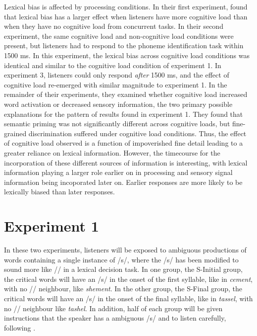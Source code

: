 Lexical bias is affected by processing conditions.  
In their first experiment, \citet{Mattys2011} found that lexical bias has a larger effect when listeners have more cognitive load than when they have no cognitive load from concurrent tasks.  
In their second experiment, the same cognitive load and non-cognitive load conditions were present, but listeners had to respond to the phoneme identification task within 1500 ms.  
In this experiment, the lexical bias across cognitive load conditions was identical and similar to the cognitive load condition of experiment 1.  
In experiment 3, listeners could only respond \emph{after} 1500 ms, and the effect of cognitive load re-emerged with similar magnitude to experiment 1.  
In the remainder of their experiments, they examined whether cognitive load increased word activation or decreased sensory information, the two primary possible explanations for the pattern of results found in experiment 1.  
They found that semantic priming was not significantly different across cognitive loads, but fine-grained discrimination suffered under cognitive load conditions.  
Thus, the effect of cognitive load observed is a function of impoverished fine detail leading to a greater reliance on lexical information.  
However, the timecourse for the incorporation of these different sources of information is interesting, with lexical information playing a larger role earlier on in processing and sensory signal information being incoporated later on.  
Earlier responses are more likely to be lexically biased than later responses.

\section{Experiment 1}

In these two experiments, listeners will be exposed to ambiguous productions of words containing a single instance of /s/, where the /s/ has been modified to sound more like /\textesh/ in a lexical decision task. 
In one group, the S-Initial group, the critical words will have an /s/ in the onset of the first syllable, like in \emph{cement}, with no /\textesh/ neighbour, like \emph{shement}.  
In the other group, the S-Final group, the critical words will have an /s/ in the onset of the final syllable, like in \emph{tassel}, with no /\textesh/ neighbour like \emph{tashel}.  
In addition, half of each group will be given instructions that the speaker has a ambiguous /s/ and to listen carefully, following \citet{Pitt2012}.

